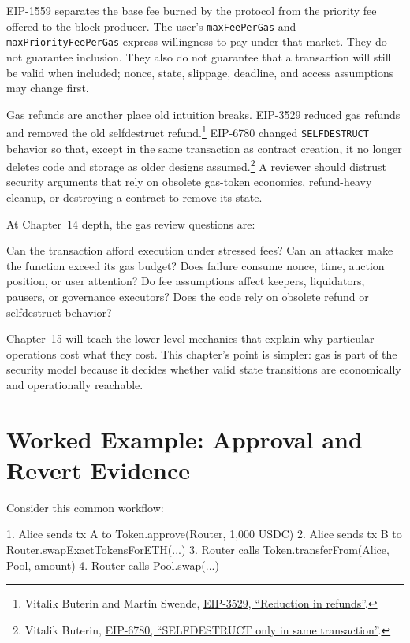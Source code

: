 EIP-1559 separates the base fee burned by the protocol from the priority fee offered to the block producer. The user's \texttt{maxFeePerGas} and \texttt{maxPriorityFeePerGas} express willingness to pay under that market. They do not guarantee inclusion. They also do not guarantee that a transaction will still be valid when included; nonce, state, slippage, deadline, and access assumptions may change first.

Gas refunds are another place old intuition breaks. EIP-3529 reduced gas refunds and removed the old selfdestruct refund.\footnote{Vitalik Buterin and Martin Swende, \href{https://eips.ethereum.org/EIPS/eip-3529}{EIP-3529, ``Reduction in refunds''}.} EIP-6780 changed \texttt{SELFDESTRUCT} behavior so that, except in the same transaction as contract creation, it no longer deletes code and storage as older designs assumed.\footnote{Vitalik Buterin, \href{https://eips.ethereum.org/EIPS/eip-6780}{EIP-6780, ``SELFDESTRUCT only in same transaction''}.} A reviewer should distrust security arguments that rely on obsolete gas-token economics, refund-heavy cleanup, or destroying a contract to remove its state.

At Chapter~14 depth, the gas review questions are:

\begin{codeblock}
Can the transaction afford execution under stressed fees?
Can an attacker make the function exceed its gas budget?
Does failure consume nonce, time, auction position, or user attention?
Do fee assumptions affect keepers, liquidators, pausers, or governance executors?
Does the code rely on obsolete refund or selfdestruct behavior?
\end{codeblock}

Chapter~15 will teach the lower-level mechanics that explain why particular operations cost what they cost. This chapter's point is simpler: gas is part of the security model because it decides whether valid state transitions are economically and operationally reachable.

\section{Worked Example: Approval and Revert Evidence}

Consider this common workflow:

\begin{codeblock}
1. Alice sends tx A to Token.approve(Router, 1,000 USDC)
2. Alice sends tx B to Router.swapExactTokensForETH(...)
3. Router calls Token.transferFrom(Alice, Pool, amount)
4. Router calls Pool.swap(...)
\end{codeblock}

